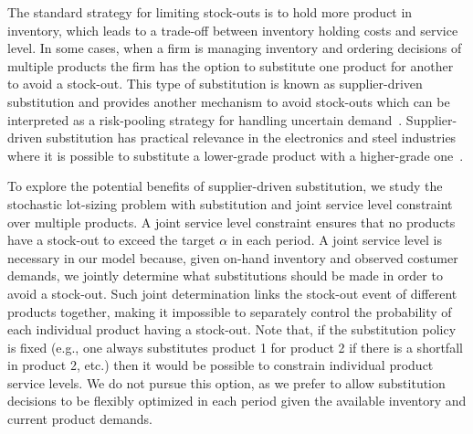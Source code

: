 \documentclass[msom]{oo}
\begin{document}
The standard strategy for limiting stock-outs is to hold more product in inventory, which leads to a trade-off between inventory holding costs and service level. In some cases, when a firm is managing inventory and ordering decisions of multiple products the firm has the option to substitute one product for another to avoid a stock-out. This type of substitution is known as supplier-driven substitution and provides another mechanism to avoid stock-outs which can be interpreted as a risk-pooling strategy for handling uncertain demand~\citep{shin2015classification}.  Supplier-driven substitution has practical relevance in the electronics and steel industries where it is possible to substitute a lower-grade product with a higher-grade one~\citep{lang2010efficient}. 

To explore the potential benefits of supplier-driven substitution, we study the stochastic lot-sizing problem with substitution and joint service level constraint over multiple products. A joint service level constraint 
ensures that no products have a stock-out to exceed the target $\alpha$ in each period. A joint service level is necessary in our model because, given on-hand inventory and observed costumer demands, we jointly determine what substitutions should be made in order to avoid a stock-out. Such joint determination links the stock-out event of different products together, making it impossible to separately control the probability of each individual product having a stock-out. Note that, if the substitution policy is fixed (e.g., one always substitutes product 1 for product 2 if there is a shortfall in product 2, etc.) then it would be possible to constrain individual product service levels. We do not pursue this option, as we prefer to allow substitution decisions to be flexibly optimized in each period given the available inventory and current product demands. 

\end{document}
